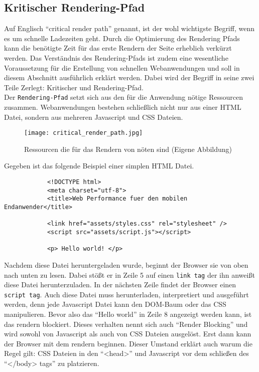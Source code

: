 	\subsection{Kritischer Rendering-Pfad} %
	\label{sub:critical_render_path}
		Auf Englisch "`critical render path"' genannt, ist der wohl wichtigste Begriff, wenn es um schnelle Ladezeiten geht. Durch die Optimierung des Rendering Pfads kann die benötigte Zeit für das erste Rendern der Seite erheblich verkürzt werden. Das Verständnis des Rendering-Pfads ist zudem eine wesentliche Voraussetzung für die Erstellung von schnellen Webanwendungen und soll in diesem Abschnitt ausführlich erklärt werden. Dabei wird der Begriff in seine zwei Teile Zerlegt: Kritischer und Rendering-Pfad.\\

		Der \texttt{Rendering-Pfad} setzt sich aus den für die Anwendung nötige Ressourcen zusammen. Webanwendungen bestehen schließlich nicht nur aus einer HTML Datei, sondern aus mehreren Javascript und CSS Dateien.

		\begin{figure}[htbp]
			\begin{center}
				\texttt{[image: critical\_render\_path.jpg]}
				\caption{Ressourcen die für das Rendern von nöten sind (Eigene Abbildung)}
				\label{fig:critical_render_path}
			\end{center}
		\end{figure}

		Gegeben ist das folgende Beispiel einer simplen HTML Datei.

		\begin{lstlisting}
			<!DOCTYPE html>
			<meta charset="utf-8">
			<title>Web Performance fuer den mobilen Endanwender</title>

			<link href="assets/styles.css" rel="stylesheet" />
			<script src="assets/script.js"></script>

			<p> Hello world! </p>

		\end{lstlisting}

		Nachdem diese Datei heruntergeladen wurde, beginnt der Browser sie von oben nach unten zu lesen. Dabei stößt er in Zeile 5 auf einen \texttt{link tag} der ihn anweißt diese Datei herunterzuladen. In der nächsten Zeile findet der Browser einen \texttt{script tag}. Auch diese Datei muss herunterladen, interpretiert und ausgeführt werden, denn jede Javascript Datei kann den DOM-Baum oder das CSS manipulieren. Bevor also das "`Hello world"' in Zeile 8 angezeigt werden kann, ist das rendern blockiert. Dieses verhalten nennt sich auch "`Render Blocking"' und wird sowohl von Javascript als auch von CSS Dateien ausgelöst.	Erst dann kann der Browser mit dem rendern beginnen. Dieser Umstand erklärt auch warum die Regel gilt: CSS Dateien in den "`<head>"' und Javascript vor dem schließen des "`</body> tags"' zu platzieren.

